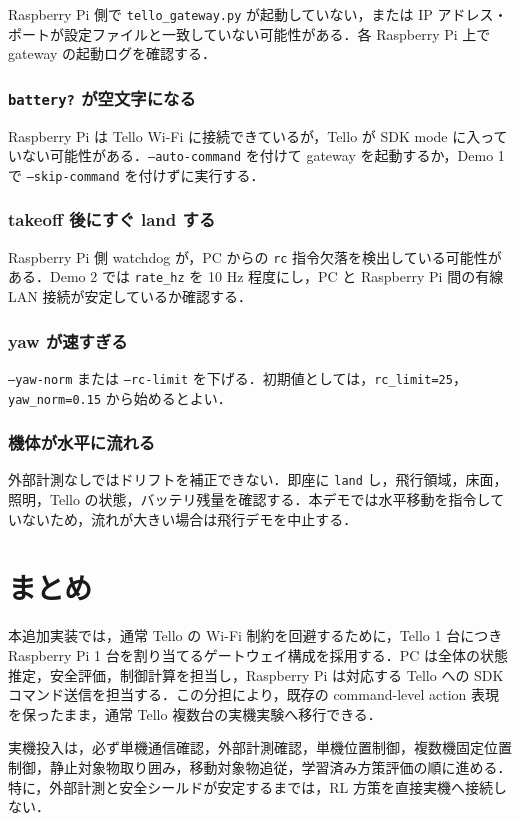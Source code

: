 Raspberry Pi 側で \texttt{tello\_gateway.py} が起動していない，または IP アドレス・ポートが設定ファイルと一致していない可能性がある．各 Raspberry Pi 上で gateway の起動ログを確認する．

\subsubsection{\texttt{battery?} が空文字になる}

Raspberry Pi は Tello Wi-Fi に接続できているが，Tello が SDK mode に入っていない可能性がある．\texttt{--auto-command} を付けて gateway を起動するか，Demo 1 で \texttt{--skip-command} を付けずに実行する．

\subsubsection{takeoff 後にすぐ land する}

Raspberry Pi 側 watchdog が，PC からの \texttt{rc} 指令欠落を検出している可能性がある．Demo 2 では \texttt{rate\_hz} を 10 Hz 程度にし，PC と Raspberry Pi 間の有線 LAN 接続が安定しているか確認する．

\subsubsection{yaw が速すぎる}

\texttt{--yaw-norm} または \texttt{--rc-limit} を下げる．初期値としては，\texttt{rc\_limit=25}，\texttt{yaw\_norm=0.15} から始めるとよい．

\subsubsection{機体が水平に流れる}

外部計測なしではドリフトを補正できない．即座に \texttt{land} し，飛行領域，床面，照明，Tello の状態，バッテリ残量を確認する．本デモでは水平移動を指令していないため，流れが大きい場合は飛行デモを中止する．

\section{まとめ}
\label{sec:summary}

本追加実装では，通常 Tello の Wi-Fi 制約を回避するために，Tello 1 台につき Raspberry Pi 1 台を割り当てるゲートウェイ構成を採用する．PC は全体の状態推定，安全評価，制御計算を担当し，Raspberry Pi は対応する Tello への SDK コマンド送信を担当する．この分担により，既存の command-level action 表現を保ったまま，通常 Tello 複数台の実機実験へ移行できる．

実機投入は，必ず単機通信確認，外部計測確認，単機位置制御，複数機固定位置制御，静止対象物取り囲み，移動対象物追従，学習済み方策評価の順に進める．特に，外部計測と安全シールドが安定するまでは，RL 方策を直接実機へ接続しない．



